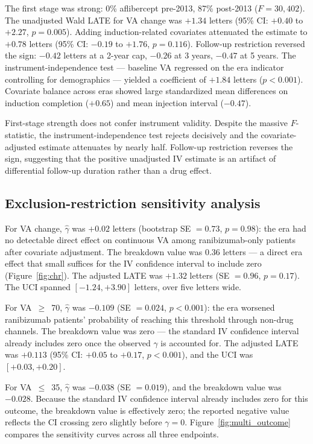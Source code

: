 \documentclass{article}
\begin{document}
The first stage was strong: 0\% aflibercept pre-2013, 87\% post-2013 ($F = 30{,}402$). The unadjusted Wald LATE for VA change was $+1.34$ letters (95\% CI: $+0.40$ to $+2.27$, $p = 0.005$). Adding induction-related covariates attenuated the estimate to $+0.78$ letters (95\% CI: $-0.19$ to $+1.76$, $p = 0.116$). Follow-up restriction reversed the sign: $-0.42$ letters at a 2-year cap, $-0.26$ at 3 years, $-0.47$ at 5 years. The instrument-independence test --- baseline VA regressed on the era indicator controlling for demographics --- yielded a coefficient of $+1.84$ letters ($p < 0.001$). Covariate balance across eras showed large standardized mean differences on induction completion ($+0.65$) and mean injection interval ($-0.47$).

First-stage strength does not confer instrument validity. Despite the massive $F$-statistic, the instrument-independence test rejects decisively and the covariate-adjusted estimate attenuates by nearly half. Follow-up restriction reverses the sign, suggesting that the positive unadjusted IV estimate is an artifact of differential follow-up duration rather than a drug effect.

\subsection{Exclusion-restriction sensitivity analysis}

For VA change, $\hat{\gamma}$ was $+0.02$ letters (bootstrap SE $= 0.73$, $p = 0.98$): the era had no detectable direct effect on continuous VA among ranibizumab-only patients after covariate adjustment. The breakdown value was 0.36 letters --- a direct era effect that small suffices for the IV confidence interval to include zero (Figure~\ref{fig:chr}). The adjusted LATE was $+1.32$ letters (SE $= 0.96$, $p = 0.17$). The UCI spanned $[-1.24, +3.90]$ letters, over five letters wide.

For VA~$\geq$~70, $\hat{\gamma}$ was $-0.109$ (SE $= 0.024$, $p < 0.001$): the era worsened ranibizumab patients' probability of reaching this threshold through non-drug channels. The breakdown value was zero --- the standard IV confidence interval already includes zero once the observed $\gamma$ is accounted for. The adjusted LATE was $+0.113$ (95\% CI: $+0.05$ to $+0.17$, $p < 0.001$), and the UCI was $[+0.03, +0.20]$.

For VA~$\leq$~35, $\hat{\gamma}$ was $-0.038$ (SE $= 0.019$), and the breakdown value was $-0.028$. Because the standard IV confidence interval already includes zero for this outcome, the breakdown value is effectively zero; the reported negative value reflects the CI crossing zero slightly before $\gamma = 0$. Figure~\ref{fig:multi_outcome} compares the sensitivity curves across all three endpoints.
\end{document}
